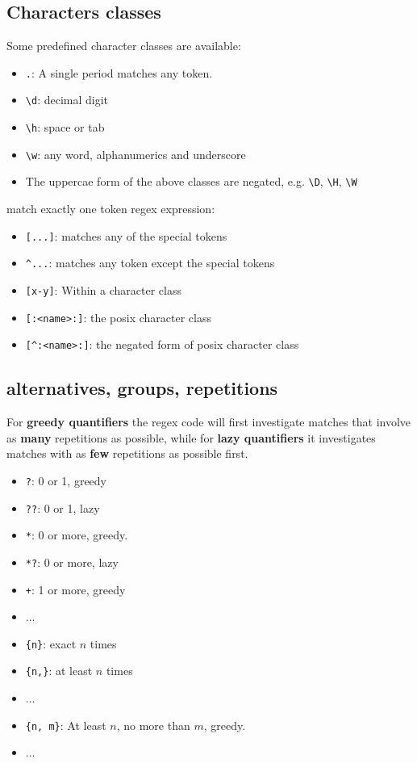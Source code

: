 \documentclass{article}
\begin{document}
\subsection{Characters classes}
Some predefined character classes are available:
\begin{itemize}
  \item \verb|.|: A single period matches any token.
  \item \verb|\d|: decimal digit
  \item \verb|\h|: space or tab
  \item \verb|\w|: any word, alphanumerics and underscore
  \item The uppercae form of the above classes are negated, e.g. \verb|\D|, \verb|\H|, \verb|\W|
\end{itemize}

match exactly one token regex expression:
\begin{itemize}
  \item \verb|[...]|: matches any of the special tokens
  \item \verb|^...|: matches any token except the special tokens
  \item \verb|[x-y]|: Within a character class
  \item \verb|[:<name>:]|: the posix character class
  \item \verb|[^:<name>:]|: the negated form of posix character class
\end{itemize}

\subsection{alternatives, groups, repetitions}
For \textbf{greedy quantifiers} the regex code will first investigate matches that involve as \textbf{many}
repetitions as possible, while for \textbf{lazy quantifiers} it investigates matches with as \textbf{few}
repetitions as possible first.
\begin{itemize}
  \item \verb|?|: 0 or 1, greedy
  \item \verb|??|: 0 or 1, lazy
  \item \verb|*|: 0 or more, greedy.
  \item \verb|*?|: 0 or more, lazy
  \item \verb|+|: 1 or more, greedy
  \item ... 
  \item \verb|{n}|: exact $n$ times 
  \item \verb|{n,}|: at least $n$ times
  \item ... 
  \item \verb|{n, m}|: At least $n$, no more than $m$, greedy.
  \item ...
\end{itemize}
\end{document}
